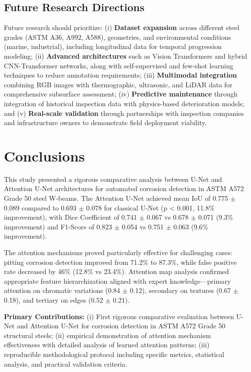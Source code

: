 \documentclass[Journal,letterpaper]{ascelike-new}
\begin{document}
\subsection{Future Research Directions}
\label{subsec:future_work}

Future research should prioritize: (i) \textbf{Dataset expansion} across different steel grades (ASTM A36, A992, A588), geometries, and environmental conditions (marine, industrial), including longitudinal data for temporal progression modeling; (ii) \textbf{Advanced architectures} such as Vision Transformers and hybrid CNN-Transformer networks, along with self-supervised and few-shot learning techniques to reduce annotation requirements; (iii) \textbf{Multimodal integration} combining RGB images with thermographic, ultrasonic, and LiDAR data for comprehensive subsurface assessment; (iv) \textbf{Predictive maintenance} through integration of historical inspection data with physics-based deterioration models; and (v) \textbf{Real-scale validation} through partnerships with inspection companies and infrastructure owners to demonstrate field deployment viability.

\section{Conclusions}
\label{sec:conclusions}

This study presented a rigorous comparative analysis between U-Net and Attention U-Net architectures for automated corrosion detection in ASTM A572 Grade 50 steel W-beams. The Attention U-Net achieved mean IoU of 0.775 $\pm$ 0.089 compared to 0.693 $\pm$ 0.078 for classical U-Net (p < 0.001, 11.8\% improvement), with Dice Coefficient of 0.741 $\pm$ 0.067 vs 0.678 $\pm$ 0.071 (9.3\% improvement) and F1-Score of 0.823 $\pm$ 0.054 vs 0.751 $\pm$ 0.063 (9.6\% improvement).

The attention mechanisms proved particularly effective for challenging cases: pitting corrosion detection improved from 71.2\% to 87.3\%, while false positive rate decreased by 46\% (12.8\% vs 23.4\%). Attention map analysis confirmed appropriate feature hierarchization aligned with expert knowledge---primary attention on chromatic variations (0.84 $\pm$ 0.12), secondary on textures (0.67 $\pm$ 0.18), and tertiary on edges (0.52 $\pm$ 0.21).

\textbf{Primary Contributions:} (i) First rigorous comparative evaluation between U-Net and Attention U-Net for corrosion detection in ASTM A572 Grade 50 structural steels; (ii) empirical demonstration of attention mechanism effectiveness with detailed analysis of learned attention patterns; (iii) reproducible methodological protocol including specific metrics, statistical analysis, and practical validation criteria.
\end{document}
